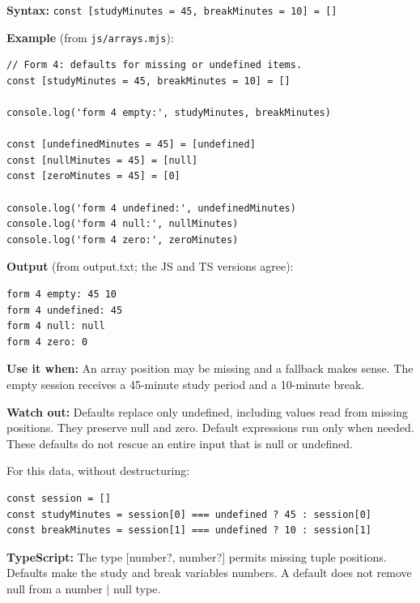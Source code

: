 \documentclass[10pt,a4paper]{article}
\begin{document}
\textbf{Syntax:} \texttt{const [study\allowbreak{}Minutes =\allowbreak{} 45,\allowbreak{} break\allowbreak{}Minutes =\allowbreak{} 10] =\allowbreak{} []}


\textbf{Example} (from \texttt{js/\allowbreak{}arrays.\allowbreak{}mjs}):

\begin{lstlisting}[language=GuideJS]
// Form 4: defaults for missing or undefined items.
const [studyMinutes = 45, breakMinutes = 10] = []

console.log('form 4 empty:', studyMinutes, breakMinutes)

const [undefinedMinutes = 45] = [undefined]
const [nullMinutes = 45] = [null]
const [zeroMinutes = 45] = [0]

console.log('form 4 undefined:', undefinedMinutes)
console.log('form 4 null:', nullMinutes)
console.log('form 4 zero:', zeroMinutes)
\end{lstlisting}


\textbf{Output} (from output.txt; the JS and TS versions agree):

\begin{lstlisting}[language={}]
form 4 empty: 45 10
form 4 undefined: 45
form 4 null: null
form 4 zero: 0
\end{lstlisting}

\textbf{Use it when:} An array position may be missing and a fallback makes sense. The empty session receives a 45-minute study period and a 10-minute break.

\textbf{Watch out:} Defaults replace only undefined, including values read from missing positions. They preserve null and zero. Default expressions run only when needed. These defaults do not rescue an entire input that is null or undefined.


For this data, without destructuring:

\begin{lstlisting}[language=GuideJS]
const session = []
const studyMinutes = session[0] === undefined ? 45 : session[0]
const breakMinutes = session[1] === undefined ? 10 : session[1]
\end{lstlisting}

\textbf{TypeScript:} The type [number?, number?] permits missing tuple positions. Defaults make the study and break variables numbers. A default does not remove null from a number | null type.
\end{document}
